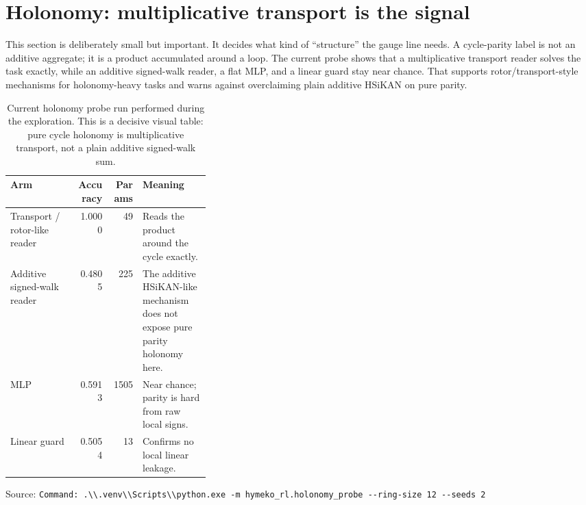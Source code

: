 \documentclass[10pt]{article}
\newcommand{\src}[1]{\par\footnotesize\textcolor{gray!70!black}{Source: \nolinkurl{#1}}\normalsize}
\begin{document}
\section{Holonomy: multiplicative transport is the signal}

This section is deliberately small but important. It decides what kind of
``structure'' the gauge line needs. A cycle-parity label is not an additive
aggregate; it is a product accumulated around a loop. The current probe shows
that a multiplicative transport reader solves the task exactly, while an
additive signed-walk reader, a flat MLP, and a linear guard stay near chance.
That supports rotor/transport-style mechanisms for holonomy-heavy tasks and
warns against overclaiming plain additive HSiKAN on pure parity.

\begin{table}[!htbp]\centering\small
\begin{tabular}{lrrp{0.34\linewidth}}
\toprule
Arm & Accuracy & Params & Meaning \\
\midrule
Transport / rotor-like reader & 1.0000 & 49 & Reads the product around the
cycle exactly. \\
Additive signed-walk reader & 0.4805 & 225 & The additive HSiKAN-like
mechanism does not expose pure parity holonomy here. \\
MLP & 0.5913 & 1505 & Near chance; parity is hard from raw local signs. \\
Linear guard & 0.5054 & 13 & Confirms no local linear leakage. \\
\bottomrule
\end{tabular}
\caption{Current holonomy probe run performed during the exploration. This is a
decisive visual table: pure cycle holonomy is multiplicative transport, not a
plain additive signed-walk sum.}
\src{Command: .\\.venv\\Scripts\\python.exe -m hymeko_rl.holonomy_probe --ring-size 12 --seeds 2}
\end{table}
\end{document}
